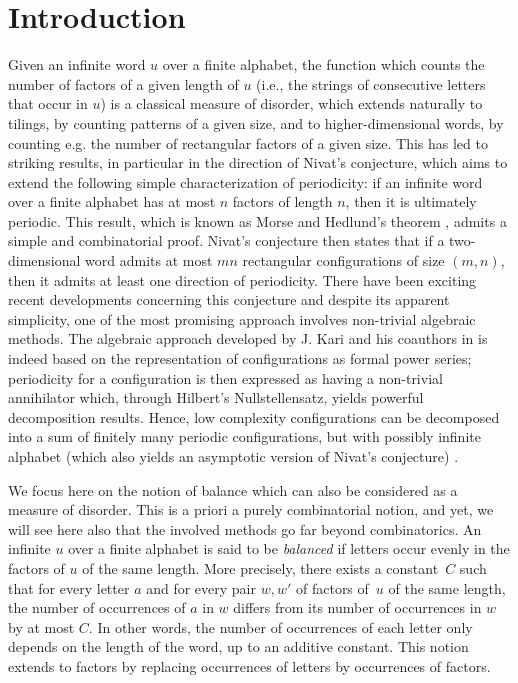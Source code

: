 \documentclass{article}
\theoremstyle{definition}
\begin{document}
\section{Introduction}
Given  an infinite word  $u$ over  a finite alphabet,  the function  which counts  the number of factors  of a given  length of $u$  (i.e.,  the  strings of consecutive letters that occur in $u$)    is a classical measure of disorder, which 
extends naturally to  tilings, by counting patterns  of a given  size, and to   higher-dimensional words, by  counting  e.g. the number of  rectangular factors of a  given size. 
This  has led to  striking   results, in particular in the direction of Nivat's conjecture,  which  aims to extend    the  following simple characterization of periodicity:  if  an infinite   word   over a finite alphabet     has at most $n$  factors of length $n$, then it 
is ultimately  periodic. This result, which   is known as  Morse and Hedlund's theorem \cite{MorseHedlund:40},  admits  a  simple and combinatorial proof. 
Nivat's conjecture   then states  that if a two-dimensional word  admits  at most $ m n$ rectangular configurations of size $(m,n)$, then it admits at least one direction of periodicity. There have been exciting recent  developments concerning   this  conjecture and  despite its apparent simplicity, one of the most promising approach  involves non-trivial  algebraic methods.  
The algebraic  approach developed by J. Kari and his coauthors  in  \cite{Sza:18,KariMoutot:19,KariSza:2020,KariMoutot:20,KaMou:23}  is indeed   based on the  representation of   configurations   as formal power series;   periodicity for a  configuration  is then  expressed  as   having  a   non-trivial annihilator which, through   Hilbert's  Nullstellensatz,
yields  powerful    decomposition results.       Hence,
low complexity configurations can be decomposed into a sum of finitely many periodic configurations, but with possibly infinite alphabet 
(which also yields  an  asymptotic version of   Nivat's conjecture) \cite{KariSza:2020}.  








 We focus here on the  notion of balance which can  also  be considered  as a measure of disorder. This is a priori a purely combinatorial notion, and yet,
  we will see here also that the involved methods  go far beyond combinatorics. 
An infinite  $u$ over  a finite alphabet  is said to be \emph{balanced}   if  letters   occur evenly  in    the  factors  of  $u$ of the same  length. More precisely,
there exists a constant~$C$ such that for every letter  $a$ and for every pair $w,w'$ of factors of~$u$ of the same length, 
the number of occurrences of $a$ in $w$ differs from its number of occurrences in $w$ by at most $C$.  In other words, the number of occurrences of each letter only depends on the length of the word, up to an additive constant. This  notion extends to  factors by replacing occurrences of letters  by occurrences of factors.
\end{document}

